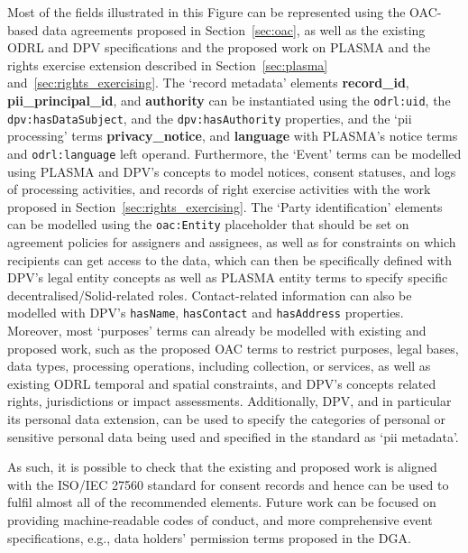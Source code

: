 Most of the fields illustrated in this Figure can be represented using the OAC-based data agreements proposed in Section~\ref{sec:oac}, as well as the existing ODRL and DPV specifications and the proposed work on PLASMA and the rights exercise extension described in Section~\ref{sec:plasma} and~\ref{sec:rights_exercising}.
The `record metadata' elements \textbf{record\_id}, \textbf{pii\_principal\_id}, and \textbf{authority} can be instantiated using the \texttt{odrl:uid}, the \texttt{dpv:hasDataSubject}, and the \texttt{dpv:hasAuthority} properties, and the `pii processing' terms \textbf{privacy\_notice}, and \textbf{language} with PLASMA's notice terms and \texttt{odrl:language} left operand.
Furthermore, the `Event' terms can be modelled using PLASMA and DPV's concepts to model notices, consent statuses, and logs of processing activities, and records of right exercise activities with the work proposed in Section~\ref{sec:rights_exercising}.
The `Party identification' elements can be modelled using the \texttt{oac:Entity} placeholder that should be set on agreement policies for assigners and assignees, as well as for constraints on which recipients can get access to the data, which can then be specifically defined with DPV's legal entity concepts as well as PLASMA entity terms to specify specific decentralised/Solid-related roles.
Contact-related information can also be modelled with DPV's \texttt{hasName}, \texttt{hasContact} and \texttt{hasAddress} properties.
Moreover, most `purposes' terms can already be modelled with existing and proposed work, such as the proposed OAC terms to restrict purposes, legal bases, data types, processing operations, including collection, or services, as well as existing ODRL temporal and spatial constraints, and DPV's concepts related rights, jurisdictions or impact assessments.
Additionally, DPV, and in particular its personal data extension, can be used to specify the categories of personal or sensitive personal data being used and specified in the standard as `pii metadata'.

As such, it is possible to check that the existing and proposed work is aligned with the ISO/IEC 27560 standard for consent records and hence can be used to fulfil almost all of the recommended elements.
Future work can be focused on providing machine-readable codes of conduct, and more comprehensive event specifications, e.g., data holders' permission terms proposed in the DGA.